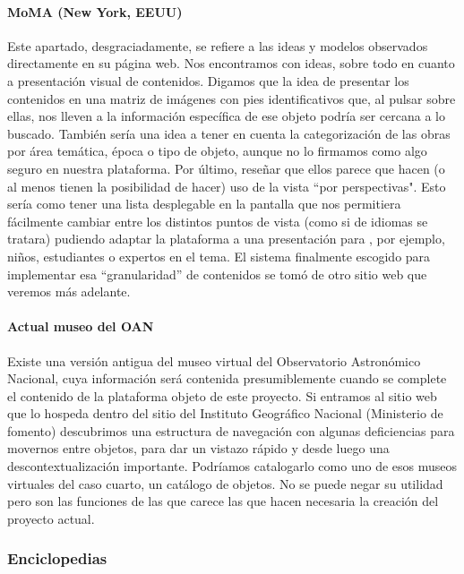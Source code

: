 \paragraph{MoMA (New York, EEUU)}
\par Este apartado, desgraciadamente, se refiere a las ideas y modelos observados directamente en su página web. Nos encontramos con ideas, sobre todo en cuanto a presentación visual de contenidos. Digamos que la idea de presentar los contenidos en una matriz de imágenes con pies identificativos que, al pulsar sobre ellas, nos lleven a la información específica de ese objeto podría ser cercana a lo buscado. También sería una idea a tener en cuenta la categorización de las obras por área temática, época o tipo de objeto, aunque no lo firmamos como algo seguro en nuestra plataforma. Por último, reseñar que ellos parece que hacen (o al menos tienen la posibilidad de hacer) uso de la vista ``por perspectivas". Esto sería como tener una lista desplegable en la pantalla que nos permitiera fácilmente cambiar entre los distintos puntos de vista (como si de idiomas se tratara) pudiendo adaptar la plataforma a una presentación para , por ejemplo, niños, estudiantes o expertos en el tema. El sistema finalmente escogido para implementar esa ``granularidad'' de contenidos se tomó de otro sitio web que veremos más adelante.


\paragraph{Actual museo del OAN}
\par Existe una versión antigua del museo virtual del Observatorio Astronómico Nacional, cuya información será contenida presumiblemente cuando se complete el contenido de la plataforma objeto de este proyecto. Si entramos al sitio web que lo hospeda dentro del sitio del Instituto Geográfico Nacional (Ministerio de fomento) descubrimos una estructura de navegación con algunas deficiencias para movernos entre objetos, para dar un vistazo rápido y desde luego una descontextualización importante. Podríamos catalogarlo como uno de esos museos virtuales del caso cuarto, un catálogo de objetos. No se puede negar su utilidad pero son las funciones de las que carece las que hacen necesaria la creación del proyecto actual.

\subsubsection{Enciclopedias}

